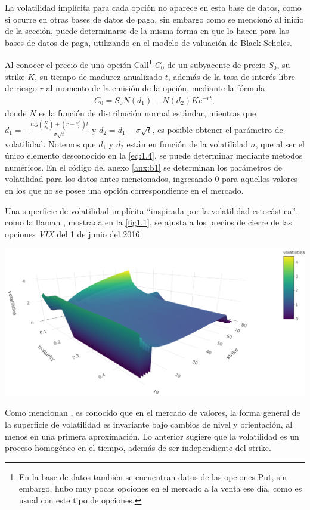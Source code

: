 \documentclass[letterpaper,12pt,oneside]{book}
\theoremstyle{plain}
\numberwithin{theorem}{section}
\begin{document}
La volatilidad implícita para cada opción no aparece en esta base de datos, como si ocurre en otras bases de datos de paga,  sin embargo como se mencionó al inicio de la sección, puede determinarse de la misma forma en que lo hacen para las bases de datos de paga, utilizando en el modelo de valuación de Black-Scholes.

Al conocer el precio de una opción Call\footnote{En la base de datos también se encuentran datos de las opciones Put, sin embargo, hubo muy pocas opciones en el mercado a la venta ese día, como es usual con este tipo de opciones.} $C_0$ de un subyacente de precio $S_0$, su strike $K$, su tiempo de madurez anualizado $t$, además de la tasa de interés libre de riesgo $r$ al momento de la emisión de la opción, mediante la fórmula
\begin{align}\label{eq:1.4}
	C_0=S_0N(d_1)-N(d_2)Ke^{-rt},
\end{align}
donde $N$ es la función de distribución normal estándar, mientras que $d_1=-\frac{log\left(\frac{K}{S_0}\right)+(r-\frac{\sigma^2}{2})t}{\sigma\sqrt{t}}$ y $d_2=d_1-\sigma\sqrt{t}$, es posible obtener el parámetro de volatilidad.
Notemos que $d_1$ y $d_2$ están en función de la volatilidad $\sigma$, que al ser el único elemento desconocido en la \cref{eq:1.4}, se puede determinar mediante métodos numéricos.
En el código del anexo \ref{anx:b1} se determinan los parámetros de volatilidad para los datos antes mencionados, ingresando $0$ para aquellos valores en los que no se posee una opción correspondiente en el mercado.

Una superficie de volatilidad implícita ``inspirada por la volatilidad estocástica'', como la llaman \cite{gatheral_arbitrage-free_2014}, mostrada en la \cref{fig1.1}, se ajusta a los precios de cierre de las opciones \textsl{VIX} del 1 de junio del 2016.
\begin{center}
\includegraphics[scale=0.38]{fig1a.png}
		\label{fig1.1}
\end{center}
Como mencionan \cite{gatheral_volatility_2018}, es conocido que en el mercado de valores, la forma general de la superficie de volatilidad es invariante bajo cambios de nivel y orientación, al menos en una primera aproximación. Lo anterior sugiere que la volatilidad es un proceso homogéneo en el tiempo, además de ser independiente del strike.
\end{document}
